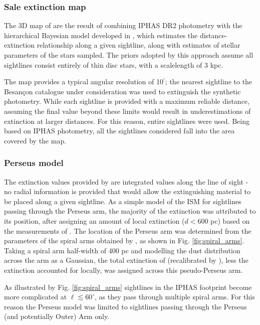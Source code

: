 \documentclass[a4paper,useAMS,usenatbib]{mn2e}
\begin{document}
\subsubsection{Sale extinction map}
The 3D map of \citet{Sale2014} are the result of combining IPHAS DR2 photometry with the hierarchical Bayesian model developed in \citet{Sale2012a}, which estimates the distance-extinction relationship along a given sightline, along with estimates of stellar parameters of the stars sampled. The priors adopted by this approach assume all sightlines consist entirely of thin disc stars, with a scalelength of 3 kpc.

The map provides a typical angular resolution of 10$^{\prime}$; the nearest sightline to the Besan\c{c}on catalogue under consideration was used to extinguish the synthetic photometry. While each sightline is provided with a maximum reliable distance, assuming the final value beyond these limits would result in underestimations of extinction at larger distances. For this reason, entire sightlines were used. Being based on IPHAS photometry, all the sightlines considered fall into the area covered by the map. 

\subsubsection{Perseus model}
The extinction values provided by \citet{Schlegel1998} are integrated values along the line of sight - no radial information is provided that would allow the extinguishing material to be placed along a given sightline. As a simple model of the ISM for sightlines passing through the Perseus arm, the majority of the extinction was attributed to its position, after assigning an amount of local extinction ($d < 600$ pc) based on the measurements of \citet{Lallement2014}. The location of the Perseus arm was determined from the parameters of the spiral arms obtained by \citet{Vallee2008}, as shown in Fig. \ref{fig:spiral_arms}. Taking a spiral arm half-width of 400 pc \citep{Vallee2014} and modelling the dust distribution across the arm as a Gaussian, the total extinction of \citet{Schlegel1998} (recalibrated by \citet{Schlafly2011}), less the extinction accounted for locally, was assigned across this pseudo-Perseus arm.

As illustrated by Fig. \ref{fig:spiral_arms} sightlines in the IPHAS footprint become more complicated at $\ell\lesssim 60^{\circ}$, as they pass through multiple spiral arms. For this reason the Perseus model was limited to sightlines passing through the Perseus (and potentially Outer) Arm only.
\end{document}
